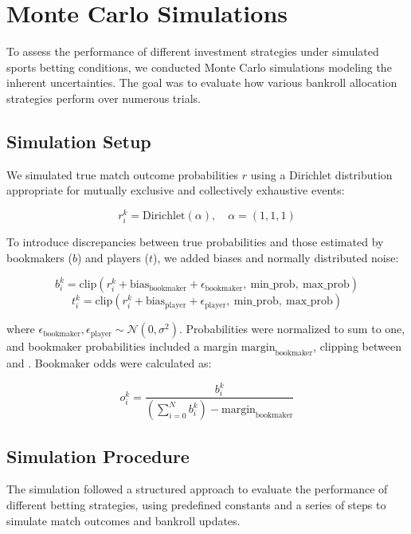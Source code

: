 \section{Monte Carlo Simulations}

To assess the performance of different investment strategies under simulated sports betting conditions, we conducted Monte Carlo simulations modeling the inherent uncertainties. The goal was to evaluate how various bankroll allocation strategies perform over numerous trials.

\subsection{Simulation Setup}

We simulated true match outcome probabilities \( r \) using a Dirichlet distribution appropriate for mutually exclusive and collectively exhaustive events:

\[
r_i^k = \text{Dirichlet}(\alpha), \quad \alpha = (1, 1, 1)
\]

To introduce discrepancies between true probabilities and those estimated by bookmakers (\( b \)) and players (\( t \)), we added biases and normally distributed noise:

\[
b_i^k = \text{clip}(r_i^k + \text{bias}_{\text{bookmaker}} + \epsilon_{\text{bookmaker}}, \ \text{min\_prob}, \ \text{max\_prob})
\]
\[
t_i^k = \text{clip}(r_i^k + \text{bias}_{\text{player}} + \epsilon_{\text{player}}, \ \text{min\_prob}, \ \text{max\_prob})
\]

where \( \epsilon_{\text{bookmaker}}, \epsilon_{\text{player}} \sim \mathcal{N}(0, \sigma^2) \). Probabilities were normalized to sum to one, and bookmaker probabilities included a margin \( \text{margin}_{\text{bookmaker}} \), clipping between  and . Bookmaker odds were calculated as:

\[
o_i^k = \frac{b_i^k}{(\sum_{i=0}^N b_i^k) - \text{margin}_{\text{bookmaker}}}
\]

\subsection{Simulation Procedure}

The simulation followed a structured approach to evaluate the performance of different betting strategies, using predefined constants and a series of steps to simulate match outcomes and bankroll updates.

